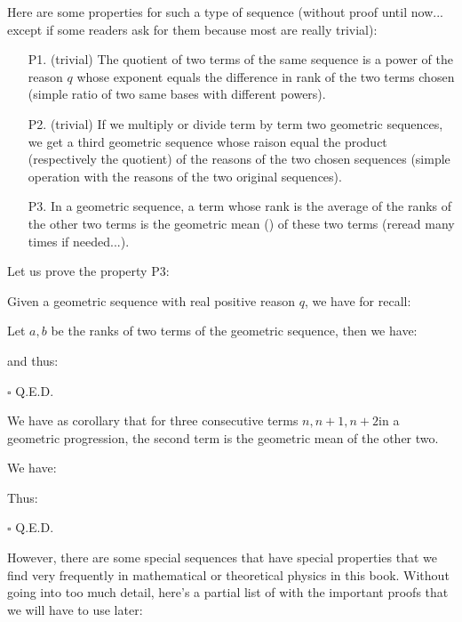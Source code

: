 Here are some properties for such a type of sequence (without proof until now... except if some readers ask for them because most are really trivial):
	\begin{enumerate}
		\item[P1.] (trivial) The quotient of two terms of the same sequence is a power of the reason $q$ whose exponent equals the difference in rank of the two terms chosen (simple ratio of two same bases with different powers).
		\item[P2.] (trivial) If we multiply or divide term by term two geometric sequences, we get a third geometric sequence whose raison equal the product (respectively the quotient) of the reasons of the two chosen sequences (simple operation with the reasons of the two original sequences).
		\item[P3.] In a geometric sequence, a term whose rank is the average of the ranks of the other two terms is the geometric mean () of these two terms (reread many times if needed...).
	\end{enumerate}
Let us prove the property P3:
\begin{dem}
	Given a geometric sequence with real positive reason $q$, we have for recall:
	
Let $a, b$ be the ranks of two terms of the geometric sequence, then we have:
	
and thus:
	
	\begin{flushright}
		$\square$  Q.E.D.
	\end{flushright}
\end{dem}

	\begin{corollary}
	We have as corollary that for three consecutive terms $n,n+1,n+2$in a geometric progression, the second term is the geometric mean of the other two.
	\end{corollary}
	\begin{dem}
		We have:
		
Thus:	
		
	\begin{flushright}
		$\square$  Q.E.D.
	\end{flushright}
	\end{dem}
However, there are some special sequences that have special properties that we find very frequently in mathematical or theoretical physics in this book. Without going into  too much detail, here's a partial list of with the important proofs that we will have to use later:

